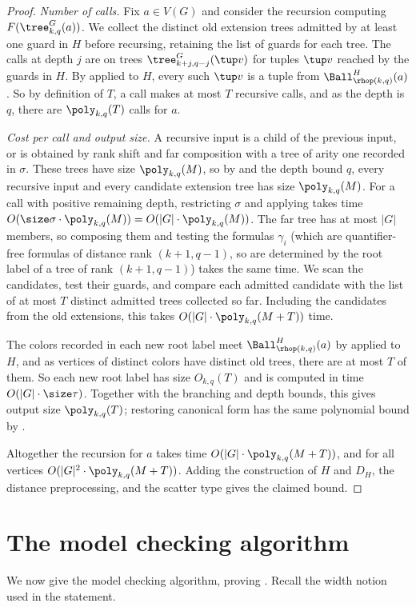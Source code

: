 \begin{proof}
\emph{Number of calls.}
Fix $a\in V(G)$ and consider the recursion computing $F(\tree^G_{k,q}(a))$.
We collect the distinct old extension trees admitted by at least one guard in $H$ before recursing, retaining the list of guards for each tree.
The calls at depth $j$ are on trees $\tree^G_{k+j,q-j}(\tup v)$ for tuples $\tup v$ reached by the guards in $H$.
By  applied to $H$, every such $\tup v$ is a tuple from $\Ball^{H}_{\rhop(k,q)}(a)$.
So by definition of $T$, a call makes at most $T$ recursive calls, and as the depth is $q$, there are $\poly_{k,q}(T)$ calls for $a$.

\emph{Cost per call and output size.}
A recursive input is a child of the previous input, or is obtained by rank shift and far composition with a  tree of arity one recorded in $\sigma$.
These trees have size $\poly_{k,q}(M)$, so by  and the depth bound $q$, every recursive input and every candidate extension tree has size $\poly_{k,q}(M)$.
For a call with positive remaining depth, restricting $\sigma$ and applying  takes time $O(\size\sigma\cdot\poly_{k,q}(M))=O(|G|\cdot\poly_{k,q}(M))$.
The far tree has at most $|G|$ members, so composing them and testing the formulas $\gamma_i$
(which are quantifier-free formulas of distance rank $(k+1,q-1)$, so are determined by the root label of a tree of rank $(k+1,q-1)$) takes the same time.
We scan the candidates, test their guards, and compare each admitted candidate with the list of at most $T$ distinct admitted trees collected so far.
Including the candidates from the old extensions, this takes $O(|G|\cdot\poly_{k,q}(M+T))$ time.

The colors recorded in each new root label meet $\Ball^{H}_{\rhop(k,q)}(a)$ by  applied to $H$, and as vertices of distinct colors have distinct old trees, there are at most $T$ of them.
So each new root label has size $O_{k,q}(T)$ and is computed in time $O(|G|\cdot\size\tau)$.
Together with the branching and depth bounds, this gives output size $\poly_{k,q}(T)$; restoring canonical form has the same polynomial bound by .

Altogether the recursion for $a$ takes time $O(|G|\cdot\poly_{k,q}(M+T))$, and for all vertices $O(|G|^2\cdot\poly_{k,q}(M+T))$.
Adding the construction of $H$ and $D_H$, the distance preprocessing, and the scatter type gives the claimed bound.
\end{proof}

\section{The model checking algorithm}\label{sec:model-checking}
We now give the model checking algorithm,
proving .
Recall the width notion used in the statement.

